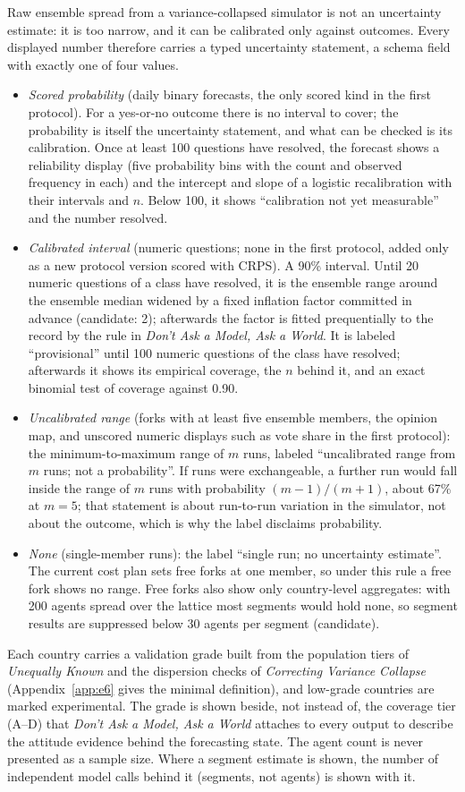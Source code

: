 \documentclass[11pt]{article}
\begin{document}
Raw ensemble spread from a variance-collapsed simulator is not an uncertainty estimate: it is too narrow, and it can be calibrated only against outcomes. Every displayed number therefore carries a typed uncertainty statement, a schema field with exactly one of four values.
\begin{itemize}
  \item \emph{Scored probability} (daily binary forecasts, the only scored kind in the first protocol). For a yes-or-no outcome there is no interval to cover; the probability is itself the uncertainty statement, and what can be checked is its calibration. Once at least 100 questions have resolved, the forecast shows a reliability display (five probability bins with the count and observed frequency in each) and the intercept and slope of a logistic recalibration with their intervals and $n$. Below 100, it shows ``calibration not yet measurable'' and the number resolved.
  \item \emph{Calibrated interval} (numeric questions; none in the first protocol, added only as a new protocol version scored with CRPS). A 90\% interval. Until 20 numeric questions of a class have resolved, it is the ensemble range around the ensemble median widened by a fixed inflation factor committed in advance (candidate: 2); afterwards the factor is fitted prequentially to the record by the rule in \emph{Don't Ask a Model, Ask a World}. It is labeled ``provisional'' until 100 numeric questions of the class have resolved; afterwards it shows its empirical coverage, the $n$ behind it, and an exact binomial test of coverage against 0.90.
  \item \emph{Uncalibrated range} (forks with at least five ensemble members, the opinion map, and unscored numeric displays such as vote share in the first protocol): the minimum-to-maximum range of $m$ runs, labeled ``uncalibrated range from $m$ runs; not a probability''. If runs were exchangeable, a further run would fall inside the range of $m$ runs with probability $(m-1)/(m+1)$, about 67\% at $m=5$; that statement is about run-to-run variation in the simulator, not about the outcome, which is why the label disclaims probability.
  \item \emph{None} (single-member runs): the label ``single run; no uncertainty estimate''. The current cost plan sets free forks at one member, so under this rule a free fork shows no range. Free forks also show only country-level aggregates: with 200 agents spread over the lattice most segments would hold none, so segment results are suppressed below 30 agents per segment (candidate).
\end{itemize}
Each country carries a validation grade built from the population tiers of \emph{Unequally Known} and the dispersion checks of \emph{Correcting Variance Collapse} (Appendix~\ref{app:e6} gives the minimal definition), and low-grade countries are marked experimental. The grade is shown beside, not instead of, the coverage tier (A--D) that \emph{Don't Ask a Model, Ask a World} attaches to every output to describe the attitude evidence behind the forecasting state. The agent count is never presented as a sample size. Where a segment estimate is shown, the number of independent model calls behind it (segments, not agents) is shown with it.
\end{document}
